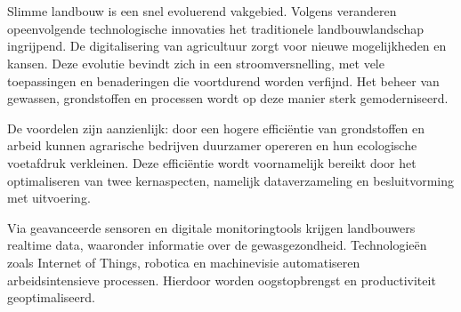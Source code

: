 \chapter{}%
\label{ch:stand-van-zaken}






Slimme landbouw is een snel evoluerend vakgebied. Volgens \textcite{Karunathilake2023} veranderen opeenvolgende technologische innovaties het traditionele landbouwlandschap ingrijpend. De digitalisering van agricultuur zorgt voor nieuwe mogelijkheden en kansen. Deze evolutie bevindt zich in een stroomversnelling, met vele toepassingen en benaderingen die voortdurend worden verfijnd. Het beheer van gewassen, grondstoffen en processen wordt op deze manier sterk gemoderniseerd. 

De voordelen zijn aanzienlijk: door een hogere efficiëntie van grondstoffen en arbeid kunnen agrarische bedrijven duurzamer opereren en hun ecologische voetafdruk verkleinen. Deze efficiëntie wordt voornamelijk bereikt door het optimaliseren van twee kernaspecten, namelijk dataverzameling en besluitvorming met uitvoering.

Via geavanceerde sensoren en digitale monitoringtools krijgen landbouwers realtime data, waaronder informatie over de gewasgezondheid. Technologieën zoals Internet of Things, robotica en machinevisie automatiseren arbeidsintensieve processen. Hierdoor worden oogstopbrengst en productiviteit geoptimaliseerd.

